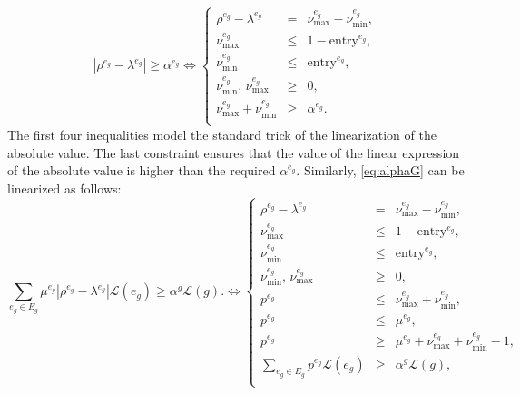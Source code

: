 \begin{equation}\label{eq:alpha-E}\tag{$\alpha$-E}
 |\rho^{e_g}-\lambda^{e_g}|\geq \alpha^{e_g} \Longleftrightarrow
 \left\{
 \begin{array}{ccl}
  \rho^{e_g} - \lambda^{e_g}                       & =    & \nu_\text{max}^{e_g} - \nu_\text{min}^{e_g},                                     \\
  \nu_\text{max}^{e_g}                         & \leq & 1-{\text{entry}^{e_g}},                                   \\
  \nu_\text{min}^{e_g}                      & \leq & {  \text{entry}^{e_g}},                                        \\
    \nu_\text{min}^{e_g}, \,\nu_\text{max}^{e_g} & \geq & 0, \\

  \nu_\text{max}^{e_g} + \nu_\text{min}^{e_g} & \geq & \alpha^{e_g}.
  \\
 \end{array}
 \right.
\end{equation}
The first four inequalities model the standard trick of the linearization of the absolute value. The last constraint ensures that the value of the linear expression of the absolute value is higher than the required  $\alpha^{e_g}$.
\noindent
Similarly, \eqref{eq:alphaG} can be linearized as follows:
\begin{equation}\label{eq:alpha-G}\tag{$\alpha$-G}
 \sum_{e_g\in E_g} \mu^{e_g}|\rho^{e_g}-\lambda^{e_g}|\mathcal L(e_g)\geq \alpha^g\mathcal L(g). \Longleftrightarrow
 \left\{
 \begin{array}{ccl}
  \rho^{e_g} - \lambda^{e_g}                       & =    & \nu_\text{max}^{e_g} - \nu_\text{min}^{e_g},                                     \\
  \nu_\text{max}^{e_g}                         & \leq & 1-{\text{entry}^{e_g}},                                   \\
  \nu_\text{min}^{e_g}                      & \leq & {  \text{entry}^{e_g}},                                        \\
  \nu_\text{min}^{e_g}, \,\nu_\text{max}^{e_g} & \geq & 0, \\
  p^{e_g} & \leq & \nu_\text{max}^{e_g} + \nu_\text{min}^{e_g}, \\
  p^{e_g} & \leq & \mu^{e_g}, \\
  p^{e_g} & \geq & \mu^{e_g} + \nu_\text{max}^{e_g} + \nu_\text{min}^{e_g} - 1, \\
  \sum_{e_g\in E_g} p^{e_g}\mathcal L(e_g) & \geq & \alpha^{g}\mathcal L(g),
  \\
 \end{array}
 \right.
\end{equation}
